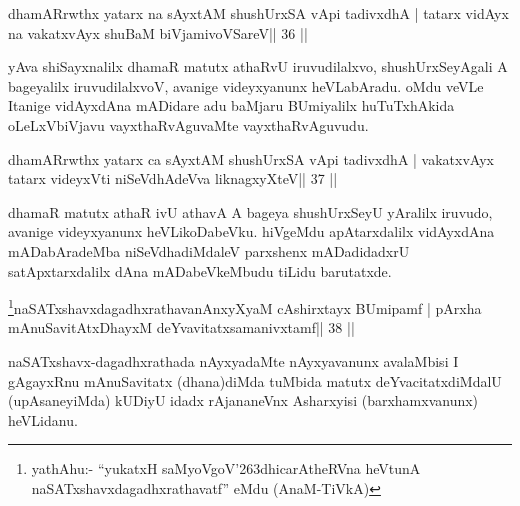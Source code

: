 
\begin{shl}
dhamARrwthx yatarx na sAyxtAM shushUrxSA vA\s pi tadivxdhA |
tatarx vidAyx na vakatxvAyx shuBaM biVjamivoVSareV\hfill || 36 ||
\end{shl}

\begin{artha}
yAva shiSayxnalilx dhamaR matutx athaRvU iruvudilalxvo, shushUrxSeyAgali A bageyalilx iruvudilalxvoV, avanige videyxyanunx heVLabAradu. oMdu veVLe Itanige vidAyxdAna mADidare adu baMjaru BUmiyalilx huTuTxhAkida oLeLxVbiVjavu vayxthaRvAguvaMte vayxthaRvAguvudu.
\end{artha} 
 

\begin{shl}
dhamARrwthx yatarx ca sAyxtAM shushUrxSA vA\s pi tadivxdhA |
vakatxvAyx tatarx videyxVti niSeVdhAdeVva liknagxyXteV\hfill || 37 ||
\end{shl}

\begin{artha}
dhamaR matutx athaR ivU athavA A bageya shushUrxSeyU yAralilx iruvudo,  avanige videyxyanunx heVLikoDabeVku. hiVgeMdu apAtarxdalilx vidAyxdAna mADabAradeMba niSeVdhadiMdaleV parxshenx mADadidadxrU satApxtarxdalilx dAna mADabeVkeMbudu tiLidu barutatxde.
\end{artha}


\begin{shl}
\footnote{yathAhu:- ``yukatxH saMyoVgoV\char'263dhicarAtheRVna 
heVtunA naSATxshavxdagadhxrathavatf'' eMdu (AnaM-TiVkA)}naSATxshavxdagadhxrathavanAnxyXyaM cA\s\s shirxtayx BUmipamf |
pArxha mAnuSavitAtxDhayxM deYvavitatxsamanivxtamf\hfill || 38 ||
\end{shl}

\begin{artha}
naSATxshavx-dagadhxrathada nAyxyadaMte nAyxyavanunx avalaMbisi I gAgayxRnu mAnuSavitatx (dhana)diMda tuMbida matutx deYvacitatxdiMdalU (upAsaneyiMda) kUDiyU idadx rAjananeVnx Asharxyisi (barxhamxvanunx) heVLidanu.
\end{artha}


